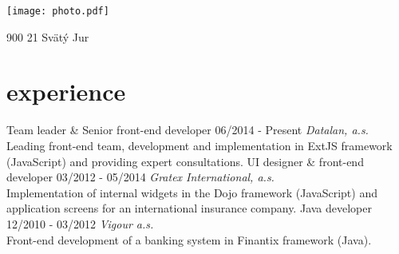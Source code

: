 \documentclass[a4paper]{cv}
\begin{document}


\begin{aside}
	\texttt{[image: photo.pdf]}
	\address{Pannónska 9}{900 21 Svätý Jur}
	\section{\vspace{5mm}         }
\end{aside}

\section{experience}
\begin{entrylist}
	\entry
		{Team leader \& Senior front-end developer}
		{06/2014 - Present}
		{\emph{Datalan, a.s.}\\
		Leading front-end team, development and implementation in ExtJS framework (JavaScript) and providing expert consultations.}
	\entry
		{UI designer \& front-end developer}
		{03/2012 - 05/2014}
		{\emph{Gratex International, a.s.}\\
		Implementation of internal widgets in the Dojo framework (JavaScript) and application screens for an international insurance company.}
	\entry
		{Java developer}
		{12/2010 - 03/2012}
		{\emph{Vigour a.s.}\\
		Front-end development of a banking system in Finantix framework (Java).}
\end{entrylist}

\end{document}
